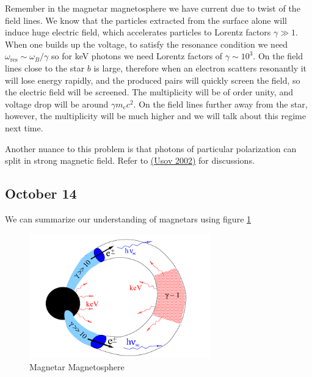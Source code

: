 \documentclass[letterpaper, 11pt]{article}
\numberwithin{equation}{section}
\numberwithin{figure}{section}
\begin{document}
Remember in the magnetar magnetosphere we have current due to twist of the field lines. We know that the particles extracted from the surface alone will induce huge electric field, which accelerates particles to Lorentz factors $\gamma \gg 1$. When one builds up the voltage, to satisfy the resonance condition we need $\omega_\mathrm{res} \sim \omega_B/\gamma$ so for keV photons we need Lorentz factors of $\gamma \sim 10^3$. On the field lines close to the star $b$ is large, therefore when an electron scatters resonantly it will lose energy rapidly, and the produced pairs will quickly screen the field, so the electric field will be screened. The multiplicity will be of order unity, and voltage drop will be around $\gamma m_ec^2$. On the field lines further away from the star, however, the multiplicity will be much higher and we will talk about this regime next time.

Another nuance to this problem is that photons of particular polarization can split in strong magnetic field. Refer to \href{http://adsabs.harvard.edu/abs/2002ApJ...572L..87U}{(Usov 2002)} for discussions.

\subsection{October 14}
\label{sec:oct-14}

We can summarize our understanding of magnetars using figure \ref{fig:magnetar}
\begin{figure}[h]
    \centering
    \includegraphics[width=0.7\textwidth]{magnetar.png}
    \caption{Magnetar Magnetosphere}
    \label{fig:magnetar}
\end{figure}
\end{document}
